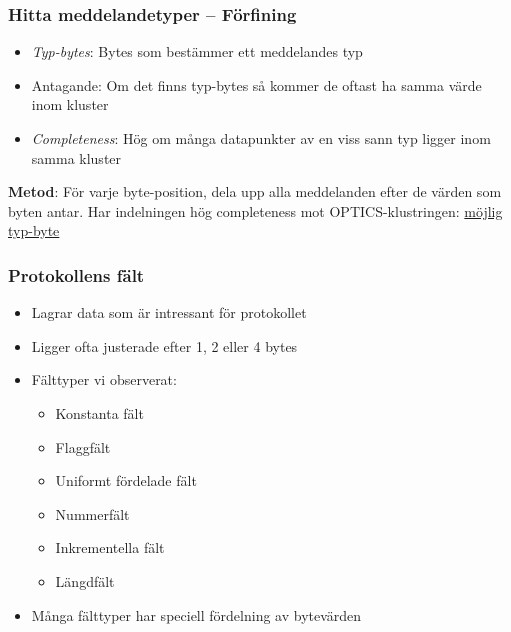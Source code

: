 \documentclass[xetex]{beamer}
\begin{document}
    \begin{frame}
        \frametitle{Hitta meddelandetyper -- Förfining}
        \begin{itemize}
            \item \emph{Typ-bytes}: Bytes som bestämmer ett meddelandes typ \\
            \item Antagande: Om det finns typ-bytes så kommer de oftast ha
                samma värde inom kluster \\
            \item \emph{Completeness}: Hög om många datapunkter av en viss
                sann typ ligger inom samma kluster
        \end{itemize}
        \vskip20pt
        \textbf{Metod}: För varje byte-position, dela upp alla meddelanden
        efter de värden som byten antar. Har indelningen hög completeness mot
        OPTICS-klustringen: \underline{möjlig typ-byte}
    \end{frame}

    \begin{frame}
        \frametitle{Protokollens fält}
        \begin{itemize}
            \item Lagrar data som är intressant för protokollet
            \item Ligger ofta justerade efter 1, 2 eller 4 bytes
            \item Fälttyper vi observerat:
                \begin{itemize}
                    \item Konstanta fält
                    \item Flaggfält
                    \item Uniformt fördelade fält
                    \item Nummerfält
                    \item Inkrementella fält
                    \item Längdfält
                \end{itemize}
            \item Många fälttyper har speciell fördelning av bytevärden
        \end{itemize}
    \end{frame}

\end{document}
